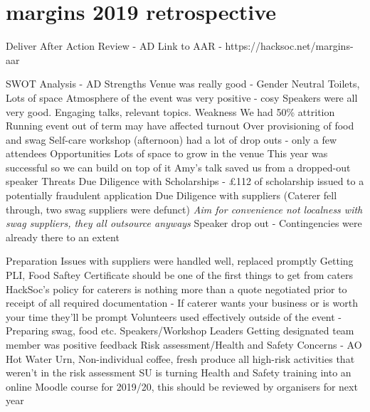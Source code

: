 \documentclass[11pt]{meetingmins}
\begin{document}
\maketitle

\section{margins 2019 retrospective}
\begin{items}
	\item Deliver After Action Review - AD
		\subitem Link to AAR - https://hacksoc.net/margins-aar
	\item SWOT Analysis - AD
		\subitem Strengths
			\subsubitem Venue was really good - Gender Neutral Toilets, Lots of space
			\subsubitem Atmosphere of the event was very positive - cosy
			\subsubitem Speakers were all very good. Engaging talks, relevant topics.
		\subitem Weakness
			\subsubitem We had 50\% attrition
			\subsubitem Running event out of term may have affected turnout
			\subsubitem Over provisioning of food and swag
			\subsubitem Self-care workshop (afternoon) had a lot of drop outs - only a few attendees
		\subitem Opportunities
			\subsubitem Lots of space to grow in the venue
			\subsubitem This year was successful so we can build on top of it
			\subsubitem Amy's talk saved us from a dropped-out speaker
		\subitem Threats
			\subsubitem Due Diligence with Scholarships - \pounds112 of scholarship issued to a potentially fraudulent application
			\subsubitem Due Diligence with suppliers (Caterer fell through, two swag suppliers were defunct) \textit{Aim for convenience not localness with swag suppliers, they all outsource anyways}
			\subsubitem Speaker drop out - Contingencies were already there to an extent
	\item Preparation
		\subitem Issues with suppliers were handled well, replaced promptly
			\subsubitem Getting PLI, Food Saftey Certificate should be one of the first things to get from caters
			\subsubitem HackSoc's policy for caterers is nothing more than a quote negotiated prior to receipt of all required documentation - If caterer wants your business or is worth your time they'll be prompt
		\subitem Volunteers used effectively outside of the event - Preparing swag, food etc.
		\subitem Speakers/Workshop Leaders Getting designated team member was positive feedback
		\subitem Risk assessment/Health and Safety Concerns - AO
			\subsubitem Hot Water Urn, Non-individual coffee, fresh produce all high-risk activities that weren't in the risk assessment
			\subsubitem SU is turning Health and Safety training into an online Moodle course for 2019/20, this should be reviewed by organisers for next year

\end{items}
\end{document}
